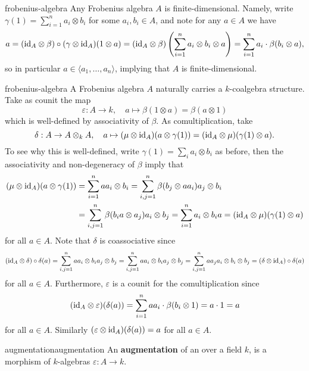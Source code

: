 \begin{example}{frobenius-algebra}
    Any Frobenius algebra $A$ is finite-dimensional. Namely, write $\gamma(1) = \sum_{i = 1}^{n} a_i \otimes b_i$ for some $a_i, b_i \in A$, and note for any $a \in A$ we have
    \[ a = (\textup{id}_A \otimes \beta) \circ (\gamma \otimes \textup{id}_A)(1 \otimes a) = (\textup{id}_A \otimes \beta) \left( \sum_{i = 1}^{n} a_i \otimes b_i \otimes a \right) = \sum_{i = 1}^{n} a_i \cdot \beta(b_i \otimes a) , \]
    so in particular $a \in \langle a_1, \ldots, a_n \rangle$, implying that $A$ is finite-dimensional.
\end{example}

\begin{example}{frobenius-algebra}
    A Frobenius algebra $A$ naturally carries a $k$-coalgebra structure. Take as counit the map
    \[ \varepsilon : A \to k, \quad a \mapsto \beta(1 \otimes a) = \beta(a \otimes 1) \]
    which is well-defined by associativity of $\beta$. As comultiplication, take
    \[ \delta : A \to A \otimes_k A, \quad a \mapsto (\mu \otimes \textup{id}_A)(a \otimes \gamma(1)) = (\textup{id}_A \otimes \mu)(\gamma(1) \otimes a) . \]
    To see why this is well-defined, write $\gamma(1) = \sum_i a_i \otimes b_i$ as before, then the associativity and non-degeneracy of $\beta$ imply that
    \[ \begin{aligned}
        (\mu \otimes \textup{id}_A)(a \otimes \gamma(1)) &= \sum_{i = 1}^{n} a a_i \otimes b_i = \sum_{i,j = 1}^{n} \beta(b_j \otimes a a_i) a_j \otimes b_i \\ &= \sum_{i,j = 1}^{n} \beta(b_i a \otimes a_j) a_i \otimes b_j = \sum_{i = 1}^{n} a_i \otimes b_i a = (\textup{id}_A \otimes \mu)(\gamma(1) \otimes a) 
    \end{aligned} \]
    for all $a \in A$. Note that $\delta$ is coassociative since
    \[ (\textup{id}_A \otimes \delta) \circ \delta(a) = \sum_{i, j = 1}^{n} a a_i \otimes b_i a_j \otimes b_j = \sum_{i, j = 1}^{n} a a_i \otimes b_i a_j \otimes b_j = \sum_{i, j = 1}^{n} a a_j a_i \otimes b_i \otimes b_j = (\delta \otimes \textup{id}_A) \circ \delta(a) \]
    for all $a \in A$. Furthermore, $\varepsilon$ is a counit for the comultiplication since
    \[ (\textup{id}_A \otimes \varepsilon)(\delta(a)) = \sum_{i = 1}^{n} a a_i \cdot \beta(b_i \otimes 1) = a \cdot 1 = a \]
    for all $a \in A$. Similarly $(\varepsilon \otimes \textup{id}_A)(\delta(a)) = a$ for all $a \in A$.
\end{example}

\begin{topic}{augmentation}{augmentation}
    An \textbf{augmentation} of an  over a field $k$, is a morphism of $k$-algebras $\varepsilon : A \to k$.
\end{topic}


